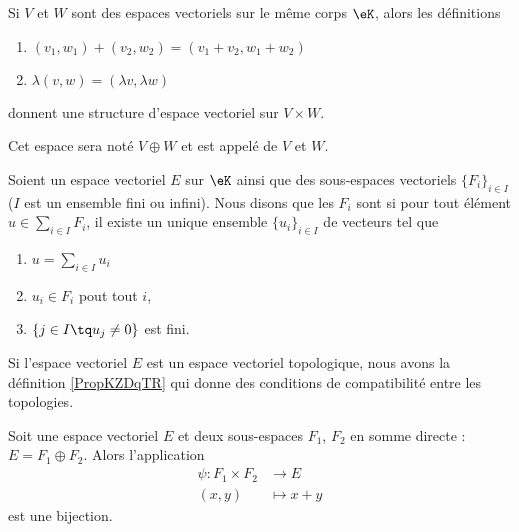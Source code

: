 \begin{propositionDef}                      \label{DEFooJKAWooKkkkwm}
	Si \( V\) et \( W\) sont des espaces vectoriels sur le même corps \( \eK\), alors les définitions
	\begin{enumerate}
		\item
		      \( (v_1,w_1)+(v_2,w_2)=(v_1+v_2,w_1+w_2)\)
		\item
		      \( \lambda(v,w)=(\lambda v,\lambda w)\)
	\end{enumerate}
	donnent une structure d'espace vectoriel sur \( V\times W\).

	Cet espace sera noté \( V\oplus W\) et est appelé  de \( V\) et \( W\).
\end{propositionDef}

\begin{definition}       \label{DEFooIJDNooRUDUYF}
	Soient un espace vectoriel \( E\) sur \(\eK\) ainsi que des sous-espaces vectoriels \( \{ F_i \}_{i\in I}\) (\( I\) est un ensemble fini ou infini). Nous disons que les \( F_i\) sont  si pour tout élément \( u\in\sum_{i\in I}F_i\), il existe un unique ensemble \( \{ u_i \}_{i\in I}\) de vecteurs tel que
	\begin{enumerate}
		\item
		      \( u=\sum_{i\in I}u_i\)
		\item
		      \( u_i\in F_i\) pout tout \( i\),
		\item
		      \( \{ j\in I\tq u_j\neq 0 \}\) est fini.
	\end{enumerate}

	Si l'espace vectoriel \( E\) est un espace vectoriel topologique, nous avons la définition \ref{PropKZDqTR} qui donne des conditions de compatibilité entre les topologies.
\end{definition}


\begin{lemma}   \label{LEMooHWRVooLedAmF}
	Soit une espace vectoriel \( E\) et deux sous-espaces \( F_1\), \( F_2\) en somme directe :  \( E=F_1\oplus F_2\). Alors l'application
	\begin{equation}
		\begin{aligned}
			\psi\colon F_1\times F_2 & \to E       \\
			(x,y)                    & \mapsto x+y
		\end{aligned}
	\end{equation}
	est une bijection.
\end{lemma}


